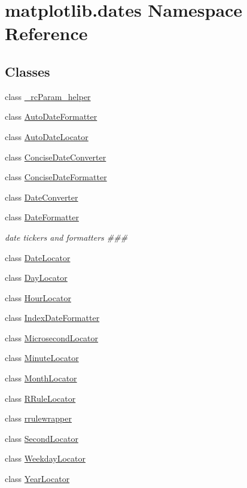 \hypertarget{namespacematplotlib_1_1dates}{}\section{matplotlib.\+dates Namespace Reference}
\label{namespacematplotlib_1_1dates}
\subsection*{Classes}
\begin{DoxyCompactItemize}
\item 
class \hyperlink{classmatplotlib_1_1dates_1_1__rcParam__helper}{\+\_\+rc\+Param\+\_\+helper}
\item 
class \hyperlink{classmatplotlib_1_1dates_1_1AutoDateFormatter}{Auto\+Date\+Formatter}
\item 
class \hyperlink{classmatplotlib_1_1dates_1_1AutoDateLocator}{Auto\+Date\+Locator}
\item 
class \hyperlink{classmatplotlib_1_1dates_1_1ConciseDateConverter}{Concise\+Date\+Converter}
\item 
class \hyperlink{classmatplotlib_1_1dates_1_1ConciseDateFormatter}{Concise\+Date\+Formatter}
\item 
class \hyperlink{classmatplotlib_1_1dates_1_1DateConverter}{Date\+Converter}
\item 
class \hyperlink{classmatplotlib_1_1dates_1_1DateFormatter}{Date\+Formatter}
\begin{DoxyCompactList}\small\item\em date tickers and formatters \#\#\# \end{DoxyCompactList}\item 
class \hyperlink{classmatplotlib_1_1dates_1_1DateLocator}{Date\+Locator}
\item 
class \hyperlink{classmatplotlib_1_1dates_1_1DayLocator}{Day\+Locator}
\item 
class \hyperlink{classmatplotlib_1_1dates_1_1HourLocator}{Hour\+Locator}
\item 
class \hyperlink{classmatplotlib_1_1dates_1_1IndexDateFormatter}{Index\+Date\+Formatter}
\item 
class \hyperlink{classmatplotlib_1_1dates_1_1MicrosecondLocator}{Microsecond\+Locator}
\item 
class \hyperlink{classmatplotlib_1_1dates_1_1MinuteLocator}{Minute\+Locator}
\item 
class \hyperlink{classmatplotlib_1_1dates_1_1MonthLocator}{Month\+Locator}
\item 
class \hyperlink{classmatplotlib_1_1dates_1_1RRuleLocator}{R\+Rule\+Locator}
\item 
class \hyperlink{classmatplotlib_1_1dates_1_1rrulewrapper}{rrulewrapper}
\item 
class \hyperlink{classmatplotlib_1_1dates_1_1SecondLocator}{Second\+Locator}
\item 
class \hyperlink{classmatplotlib_1_1dates_1_1WeekdayLocator}{Weekday\+Locator}
\item 
class \hyperlink{classmatplotlib_1_1dates_1_1YearLocator}{Year\+Locator}
\end{DoxyCompactItemize}
